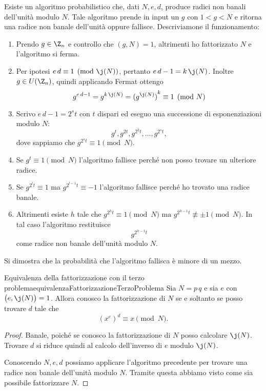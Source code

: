 	Esiste un algoritmo probabilistico che, dati \(N,e,d\), produce radici non banali dell'unità modulo \(N\).
	Tale algoritmo prende in input un \(g\) con \(1<g<N\) e ritorna una radice non banale dell'unità oppure fallisce. Descriviamone il funzionamento:
	\begin{enumerate}
		\item Prendo \(g\in \Z_n\) e controllo che \((g,N)=1\), altrimenti ho fattorizzato \(N\) e l'algoritmo si ferma.
		\item Per ipotesi \(e\,d\equiv 1 \pmod{\j(N)}\), pertanto \(e\,d-1 =k\,\j(N)\). Inoltre \(g\in U(\Z_n)\), quindi applicando Fermat ottengo
			\[
			g^{e\,d-1} = g^{k\,\j(N)} = {(g^{\j(N)})}^k \equiv 1 \pmod{N}
			\]
		\item Scrivo \(e\,d-1=2^s t\) con \(t\) dispari ed eseguo una successione di esponenziazioni modulo \(N\):
			\[
			g^t, g^{2t}, g^{2^2 t}, \ldots, g^{2^s t},
			\]
		dove sappiamo che \(g^{2^s t} \equiv 1 \pmod{N}\).
		\item Se \(g^t \equiv 1 \pmod{N}\) l'algoritmo fallisce perché non posso trovare un ulteriore radice.
		\item Se \(g^{2^l t} \equiv 1\) ma \(g^{2^{l-1}t}\equiv -1\) l'algoritmo fallisce perché ho trovato una radice banale.
		\item Altrimenti esiste \(h\) tale che \(g^{2^h t} \equiv 1 \pmod{N}\) ma \(g^{2^{h-1}t}\not\equiv \pm 1 \pmod{N}\). In tal caso l'algoritmo restituisce
			\[
			g^{2^{h-1}t}
			\]
		come radice non banale dell'unità modulo \(N\).
	\end{enumerate}

	\begin{oss}
	Si dimostra che la probabilità che l'algoritmo fallisca è minore di un mezzo.
	\end{oss}

	\begin{prop}{Equivalenza della fattorizzazione con il terzo problema}{equivalenzaFattorizzazioneTerzoProblema}
	Sia \(N=p\,q\) e sia \(e\) con \(\big(e,\j(N)\big)=1\).
	Allora conosco la fattorizzazione di \(N\) se e soltanto se posso trovare \(d\) tale che
		\[
		{(x^e)}^d \equiv x \pmod{N}.
		\]
	\end{prop}

	\begin{proof}
	\graffito{\(\Rightarrow)\)} Banale, poiché se conosco la fattorizzazione di \(N\) posso calcolare \(\j(N)\). Trovare \(d\) si riduce quindi al calcolo dell'inverso di \(e\) modulo \(\j(N)\).

	\graffito{\(\Leftarrow)\)} Conoscendo \(N,e,d\) possiamo applicare l'algoritmo precedente per trovare una radice non banale dell'unità modulo \(N\). Tramite questa abbiamo visto come sia possibile fattorizzare \(N\).
	\end{proof}

